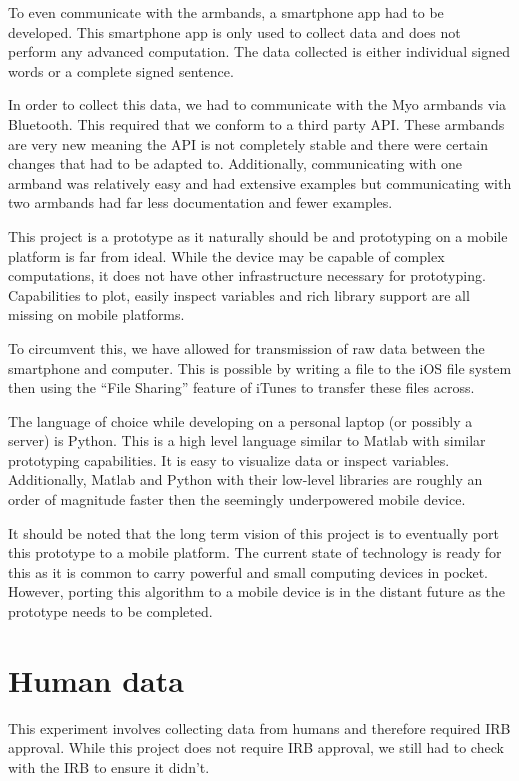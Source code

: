 To even communicate with the armbands, a smartphone app had to be developed. This smartphone app is only used to collect data and does not perform any advanced computation. The data collected is either individual signed words or a complete signed sentence.

In order to collect this data, we had to communicate with the Myo armbands via Bluetooth. This required that we conform to a third party API. These armbands are very new meaning the API is not completely stable and there were certain changes that had to be adapted to. Additionally, communicating with one armband was relatively easy and had extensive examples but communicating with two armbands had far less documentation and fewer examples.

This project is a prototype as it naturally should be and prototyping on a mobile platform is far from ideal. While the device may be capable of complex computations, it does not have other infrastructure necessary for prototyping. Capabilities to plot, easily inspect variables and rich library support are all missing on mobile platforms.

To circumvent this, we have allowed for transmission of raw data between the smartphone and computer. This is possible by writing a file to the iOS file system then using the ``File Sharing'' feature of iTunes to transfer these files across.

The language of choice while developing on a personal laptop (or possibly a server) is Python. This is a high level language similar to Matlab with similar prototyping capabilities. It is easy to visualize data or inspect variables. Additionally, Matlab and Python with their low-level libraries are roughly an order of magnitude faster then the seemingly underpowered mobile device.

It should be noted that the long term vision of this project is to eventually port this prototype to a mobile platform. The current state of technology is ready for this as it is common to carry powerful and small computing devices in pocket. However, porting this algorithm to a mobile device is in the distant future as the prototype needs to be completed.

\system

\section{Human data}
This experiment involves collecting data from humans and therefore required IRB approval. While this project does not require IRB approval, we still had to check with the IRB to ensure it didn't.

